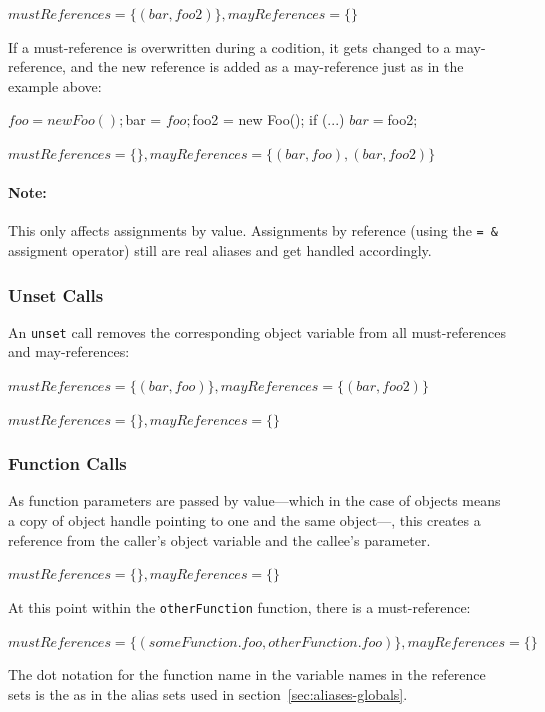 $mustReferences = \{(bar, foo2)\}, mayReferences = \{\}$

If a must-reference is overwritten during a codition, it gets changed to a may-reference, and the new reference is added as a may-reference just as in the example above:

\begin{phpcode}
$foo = new Foo();
$bar = $foo;

$foo2 = new Foo();
if (...) {
  $bar = $foo2;
}
\end{phpcode}

$mustReferences = \{\}, mayReferences = \{(bar, foo), (bar, foo2)\}$

\paragraph{Note:} This only affects assignments by value. Assignments by reference (using the \texttt{=~\&} assigment operator) still are real aliases and get handled accordingly.


\subsubsection{Unset Calls}

An \texttt{unset} call removes the corresponding object variable from all must-references and may-references:

$mustReferences = \{(bar, foo)\}, mayReferences = \{(bar, foo2)\}$


$mustReferences = \{\}, mayReferences = \{\}$


\subsubsection{Function Calls}

As function parameters are passed by value---which in the case of objects means a copy of object handle pointing to one and the same object---, this creates a reference from the caller's object variable and the callee's parameter.

$mustReferences = \{\}, mayReferences = \{\}$

\begin{phpcode}
function someFunction() {
  $foo = new Foo();
  otherFunction(foo);
}

function otherFunction(Foo $foo) {
\end{phpcode}

At this point within the \texttt{otherFunction} function, there is a must-reference:

$mustReferences = \{(someFunction.foo, otherFunction.foo)\}, mayReferences = \{\}$

The dot notation for the function name in the variable names in the reference sets is the as in the alias sets used in section~\ref{sec:aliases-globals}.
